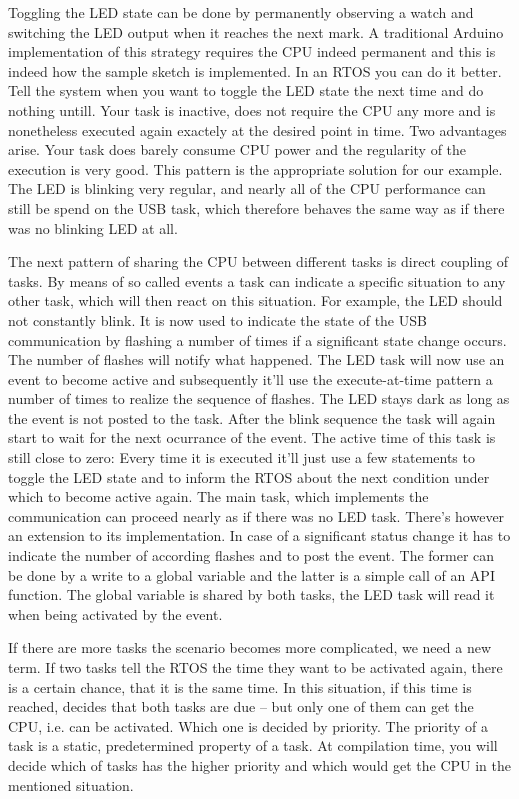 Toggling the LED state can be done by permanently observing a watch and
switching the LED output when it reaches the next mark. A traditional
Arduino implementation of this strategy requires the CPU indeed permanent
and this is indeed how the sample sketch  is implemented. In
an RTOS you can do it better. Tell the system when you want to toggle the
LED state the next time and do nothing untill. Your task is inactive, does
not require the CPU any more and is nonetheless executed again exactely at
the desired point in time. Two advantages arise. Your task does barely
consume CPU power and the regularity of the execution is very good. This
pattern is the appropriate solution for our example. The LED is blinking
very regular, and nearly all of the CPU performance can still be spend on
the USB task, which therefore behaves the same way as if there was no
blinking LED at all.

The next pattern of sharing the CPU between different tasks is direct
coupling of tasks. By means of so called events a task can indicate a
specific situation to any other task, which will then react on this
situation. For example, the LED should not constantly blink. It is now
used to indicate the state of the USB communication by flashing a number
of times if a significant state change occurs. The number of flashes will
notify what happened. The LED task will now use an event to become active
and subsequently it'll use the execute-at-time pattern a number of times
to realize the sequence of flashes. The LED stays dark as long as the
event is not posted to the task. After the blink sequence the task will
again start to wait for the next ocurrance of the event. The active time of
this task is still close to zero: Every time it is executed it'll just use
a few statements to toggle the LED state and to inform the RTOS about the
next condition under which to become active again. The main task, which
implements the communication can proceed nearly as if there was no LED
task. There's however an extension to its implementation. In case of a
significant status change it has to indicate the number of according
flashes and to post the event. The former can be done by a write to a
global variable and the latter is a simple call of an \rtos{} API
function. The global variable is shared by both tasks, the LED task will
read it when being activated by the event.

If there are more tasks the scenario becomes more complicated, we need a
new term. If two tasks tell the RTOS the time they want to be activated
again, there is a certain chance, that it is the same time. In this
situation, if this time is reached, \rtos{} decides that both tasks are
due -- but only one of them can get the CPU, i.e. can be activated. Which
one is decided by priority. The priority of a task is a static,
predetermined property of a task. At compilation time, you will decide
which of tasks has the higher priority and which would get the CPU in the
mentioned situation. 

